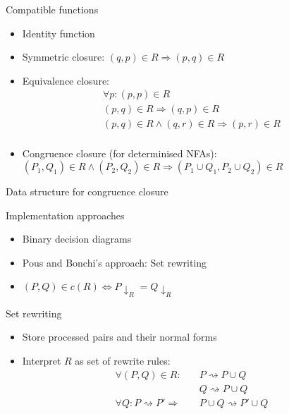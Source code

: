 \documentclass[compress]{beamer}
\begin{document}
\begin{frame}{Compatible functions}
  \begin{itemize}
    \item<1-> Identity function
    \item<2-> Symmetric closure: $(q, p) \in R \Rightarrow (p, q) \in R$
    \item<3-> Equivalence closure:
      \begin{align*}
        \forall p: (p, p) \in R\\
        (p, q) \in R \Rightarrow (q, p) \in R\\
        (p, q) \in R \land (q, r) \in R \Rightarrow (p, r) \in R\\
      \end{align*}
    \item<4-> Congruence closure (for determinised NFAs):\\
        $(P_1, Q_1) \in R \land (P_2, Q_2) \in R \Rightarrow (P_1 \cup Q_1, P_2 \cup Q_2) \in R$
  \end{itemize}
\end{frame}





\begin{frame}{Data structure for congruence closure}
  \begin{block}{Implementation approaches}
    \begin{itemize}
        \item Binary decision diagrams
        \item Pous and Bonchi's approach: Set rewriting
        \item $(P, Q) \in c(R) \iff P \downarrow_R = Q \downarrow_R$
    \end{itemize}
  \end{block}
\end{frame}

\begin{frame}{Set rewriting}
  \begin{itemize}
    \item Store processed pairs and their normal forms
    \item Interpret $R$ as set of rewrite rules:
      \begin{align*}
        \forall (P, Q) \in R: \quad&P \rightsquigarrow P \cup Q\\
                              &Q \rightsquigarrow P \cup Q\\
        \forall Q: P \rightsquigarrow P' \Rightarrow & P \cup Q \rightsquigarrow P' \cup Q
      \end{align*}
  \end{itemize}
\end{frame}
\end{document}
